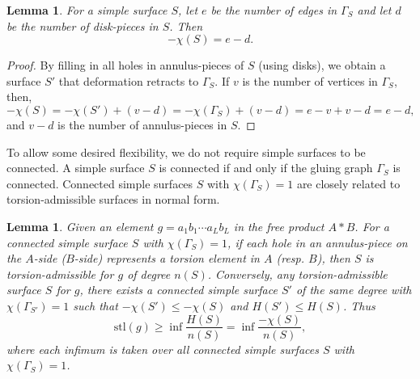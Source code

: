 \documentclass{amsart}
\newtheorem{lemma}[theorem]{Lemma}
\theoremstyle{definition}
\numberwithin{equation}{section}
\theoremstyle{theorem}
\theoremstyle{remark}
\def\stl{\mathrm{stl}}
\begin{document}
	\begin{lemma}\label{lemma: chi formula via graph}
		For a simple surface $S$, let $e$ be the number of edges in $\Gamma_S$ and let $d$ be the number of disk-pieces in $S$. Then
		$$-\chi(S)=e-d.$$
	\end{lemma}
	\begin{proof}
		By filling in all holes in annulus-pieces of $S$ (using disks), we obtain a surface $S'$ that deformation retracts to $\Gamma_S$. If $v$ is the number of vertices in $\Gamma_S$, then, 
		$$-\chi(S)=-\chi(S')+(v-d)=-\chi(\Gamma_S)+(v-d)=e-v+v-d=e-d,$$
		and $v-d$ is the number of annulus-pieces in $S$.
	\end{proof}
	
	To allow some desired flexibility, we do not require simple surfaces to be connected. A simple surface $S$ is connected if and only if the gluing graph $\Gamma_S$ is connected. Connected simple surfaces $S$ with $\chi(\Gamma_S)=1$ are closely related to torsion-admissible surfaces in normal form.
	\begin{lemma}\label{lemma: stl and simple surfaces}
		Given an element $g=a_1b_1\cdots a_Lb_L$ in the free product $A*B$. For a connected simple surface $S$ with $\chi(\Gamma_S)=1$, 
		if each hole in an annulus-piece on the $A$-side ($B$-side) represents a torsion element in $A$ (resp. $B$), 
		then $S$ is torsion-admissible for $g$ of degree $n(S)$.
		Conversely, any torsion-admissible surface $S$ for $g$, there exists a connected simple surface $S'$ of the same degree with $\chi(\Gamma_{S'})=1$ such that $-\chi(S')\le -\chi(S)$ and $H(S')\le H(S)$. 
		Thus
		\begin{equation}\label{eqn: stl simple estimate}
			\stl(g)\ge\inf \frac{H(S)}{n(S)}=\inf \frac{-\chi(S)}{n(S)},
		\end{equation}
		where each infimum is taken over all connected simple surfaces $S$ with $\chi(\Gamma_S)=1$.
	\end{lemma}
\end{document}
